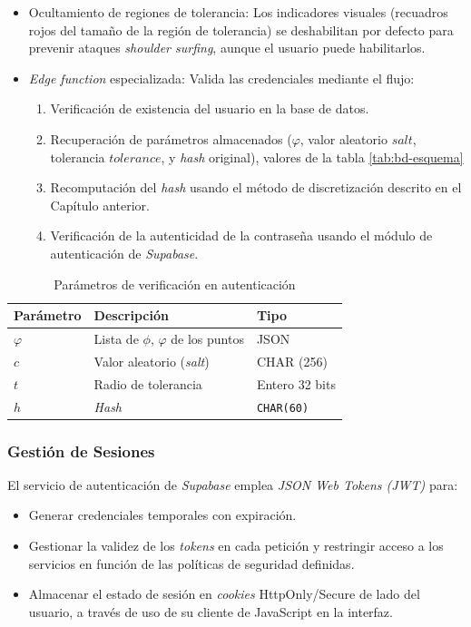 \begin{itemize}
	\item Ocultamiento de regiones de tolerancia: Los indicadores visuales (recuadros rojos del tama\~no de la regi\'on de tolerancia) se deshabilitan por defecto para prevenir ataques \textit{shoulder surfing}, aunque el usuario puede habilitarlos.
	\item \textit{Edge function} especializada: Valida las credenciales mediante el flujo:
	\begin{enumerate}
		\item Verificación de existencia del usuario en la base de datos.
		\item Recuperación de parámetros almacenados ($\varphi$, valor aleatorio $salt$, tolerancia $tolerance$, y \textit{hash} original), valores de la tabla \ref{tab:bd-esquema}
		\item Recomputación del \textit{hash} usando el método de discretización descrito en el Capítulo anterior.
		\item Verificaci\'on de la autenticidad de la contrase\~na usando el m\'odulo de autenticaci\'on de \textit{Supabase}.
	\end{enumerate}
\end{itemize}

\begin{table}[ht]
	\centering
	\caption{Parámetros de verificación en autenticación}
	\label{tab:parametros-verificacion}
	\begin{tabularx}{\textwidth}{lXl}
		\toprule
		\textbf{Parámetro} & \textbf{Descripción} & \textbf{Tipo} \\
		\midrule
		$\varphi$ & Lista de $\phi$, $\varphi$ de los puntos & JSON \\
		$c$ & Valor aleatorio  (\textit{salt}) & CHAR (256) \\
		$t$ & Radio de tolerancia & Entero 32 bits \\
		$h$ & \textit{Hash} & \texttt{CHAR(60)} \\
		\bottomrule
	\end{tabularx}
\end{table}

\subsubsection{Gestión de Sesiones}
El servicio de autenticación de \textit{Supabase}  emplea \textit{JSON Web Tokens (JWT)} para:

\begin{itemize}
	\item Generar credenciales temporales con expiración.
	\item Gestionar la validez de los \textit{tokens} en cada petici\'on y restringir acceso a los servicios en funci\'on de las pol\'iticas de seguridad definidas.
	\item Almacenar el estado de sesión en \textit{cookies} HttpOnly/Secure de lado del usuario, a trav\'es de uso de su cliente de JavaScript en la interfaz.
\end{itemize}

